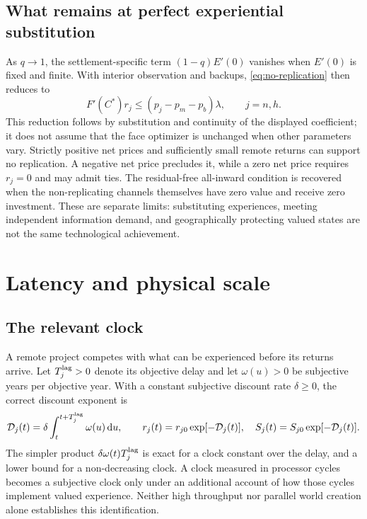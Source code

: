 \documentclass[11pt,a4paper]{article}
\theoremstyle{definition}\newtheorem{definition}{Definition}
\newcommand{\dd}{\,\mathrm{d}}
\begin{document}
\subsection{What remains at perfect experiential substitution}
As $q\to1$, the settlement-specific term $(1-q)E'(0)$ vanishes when
$E'(0)$ is fixed and finite. With interior observation and backups,
\cref{eq:no-replication} then reduces to
\begin{equation}
 F'(C^*)r_j\leq(p_j-p_m-p_b)\lambda,\qquad j=n,h.
 \label{eq:replication-reduced}
\end{equation}
This reduction follows by substitution and continuity of the displayed
coefficient; it does not assume that the face optimizer is unchanged
when other parameters vary. Strictly positive net prices and sufficiently
small remote returns can support no replication. A negative net price
precludes it, while a zero net price requires $r_j=0$ and may admit ties.
The residual-free all-inward condition is recovered when the non-replicating
channels themselves have zero value and receive zero investment. These
are separate limits: substituting experiences, meeting independent
information demand, and geographically protecting valued states are not
the same technological achievement.

\section{Latency and physical scale}
\label{sec:latency}
\subsection{The relevant clock}
A remote project competes with what can be experienced before its returns
arrive. Let $T_j^{\rm lag}>0$ denote its objective delay and let
$\omega(u)>0$ be subjective years per objective year. With a constant
subjective discount rate $\delta\geq0$, the correct discount exponent is
\begin{equation}
 \mathcal D_j(t)=\delta\int_t^{t+T_j^{\rm lag}}\omega(u)\dd u,
 \qquad r_j(t)=r_{j0}\exp[-\mathcal D_j(t)],\quad
 S_j(t)=S_{j0}\exp[-\mathcal D_j(t)].
 \label{eq:subjective-delay}
\end{equation}
The simpler product $\delta\omega(t)T_j^{\rm lag}$ is exact for a clock
constant over the delay, and a lower bound for a non-decreasing clock.
A clock measured in processor cycles becomes a subjective clock only
under an additional account of how those cycles implement valued
experience. Neither high throughput nor parallel world creation alone
establishes this identification.
\end{document}
